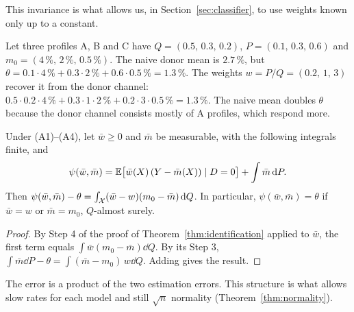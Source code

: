 This invariance is what allows us, in Section~\ref{sec:classifier}, to use weights known only up to a constant.

\begin{example}\label{ex:toy}
Let three profiles A, B and C have $Q=(0.5,\,0.3,\,0.2)$, $P=(0.1,\,0.3,\,0.6)$ and $m_0=(4\,\%,\,2\,\%,\,0.5\,\%)$. The naive donor mean is $2.7\,\%$, but $\theta=0.1\cdot4\,\%+0.3\cdot2\,\%+0.6\cdot0.5\,\%=1.3\,\%$. The weights $w=P/Q=(0.2,\,1,\,3)$ recover it from the donor channel: $0.5\cdot0.2\cdot4\,\%+0.3\cdot1\cdot2\,\%+0.2\cdot3\cdot0.5\,\%=1.3\,\%$. The naive mean doubles $\theta$ because the donor channel consists mostly of A profiles, which respond more.
\end{example}

\begin{proposition}\label{prop:dr}
Under (A1)--(A4), let $\bar w\ge0$ and $\bar m$ be measurable, with the following integrals finite, and
\[
\psi(\bar w,\bar m)=\mathbb{E}\bigl[\bar w(X)\,(Y-\bar m(X))\mid D=0\bigr]+\int\bar m\,\mathrm{d} P .
\]
Then $\psi(\bar w,\bar m)-\theta=\int_{\mathcal{X}}(\bar w-w)(m_0-\bar m)\,\mathrm{d} Q$. In particular, $\psi(\bar w,\bar m)=\theta$ if $\bar w=w$ or $\bar m=m_0$, $Q$-almost surely.
\end{proposition}
\begin{proof}
By Step 4 of the proof of Theorem~\ref{thm:identification} applied to $\bar w$, the first term equals $\int\bar w(m_0-\bar m)\dd Q$. By its Step 3, $\int\bar m\dd P-\theta=\int(\bar m-m_0)\,w\dd Q$. Adding gives the result.
\end{proof}

The error is a product of the two estimation errors. This structure is what allows slow rates for each model and still $\sqrt n$ normality (Theorem~\ref{thm:normality}).
